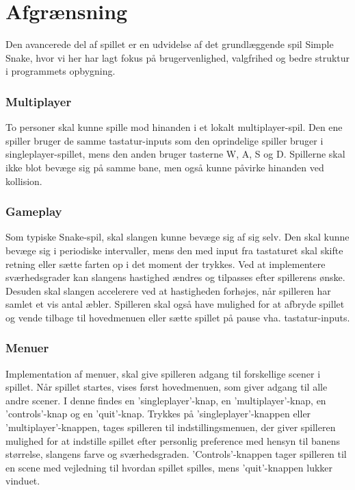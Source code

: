 \section{Afgrænsning}
Den avancerede del af spillet er en udvidelse af det grundlæggende spil Simple Snake, hvor vi her har lagt fokus på brugervenlighed, valgfrihed og bedre struktur i programmets opbygning.

\subsubsection*{Multiplayer}
To personer skal kunne spille mod hinanden i et lokalt multiplayer-spil. Den ene spiller bruger de samme tastatur-inputs som den oprindelige spiller bruger i singleplayer-spillet, mens den anden bruger tasterne W, A, S og D. Spillerne skal ikke blot bevæge sig på samme bane, men også kunne påvirke hinanden ved kollision.

\subsubsection*{Gameplay}
Som typiske Snake-spil, skal slangen kunne bevæge sig af sig selv. Den skal kunne bevæge sig i periodiske intervaller, mens den med input fra tastaturet skal skifte retning eller sætte farten op i det moment der trykkes. Ved at implementere sværhedsgrader kan slangens hastighed ændres og tilpasses efter spillerens ønske. Desuden skal slangen accelerere ved at hastigheden forhøjes, når spilleren har samlet et vis antal æbler. Spilleren skal også have mulighed for at afbryde spillet og vende tilbage til hovedmenuen eller sætte spillet på pause vha. tastatur-inputs.

\subsubsection*{Menuer}
Implementation af menuer, skal give spilleren adgang til forskellige scener i spillet. Når spillet startes, vises først hovedmenuen, som giver adgang til alle andre scener. I denne findes en 'singleplayer'-knap, en 'multiplayer'-knap, en 'controls'-knap og en 'quit'-knap. Trykkes på 'singleplayer'-knappen eller 'multiplayer'-knappen, tages spilleren til indstillingsmenuen, der giver spilleren mulighed for at indstille spillet efter personlig preference med hensyn til banens størrelse, slangens farve og sværhedsgraden. 'Controls'-knappen tager spilleren til en scene med vejledning til hvordan spillet spilles, mens 'quit'-knappen lukker vinduet.

